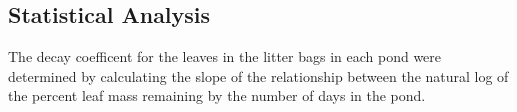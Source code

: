 \subsection{Statistical Analysis}

The decay coefficent for the leaves in the litter bags in each pond were determined by calculating the slope of the relationship between the natural log of the percent leaf mass remaining by the number of days in the pond.

